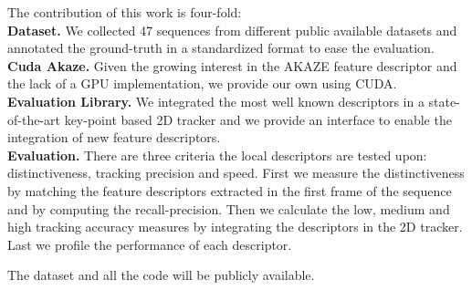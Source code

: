 \documentclass[letterpaper, 10pt, conference]{ieeeconf}
\begin{document}
The contribution of this work is four-fold:\\
\textbf{Dataset.} We collected 47 sequences from different public available datasets and annotated the ground-truth in a standardized format to ease the evaluation.\\
\textbf{Cuda Akaze.} Given the growing interest in the AKAZE feature descriptor and the lack of a GPU implementation, we provide our own using CUDA.\\
\textbf{Evaluation Library.} We integrated the most well known descriptors in a state-of-the-art key-point based 2D tracker and we provide an interface to enable the integration of new feature descriptors.\\
\textbf{Evaluation.}  There are three criteria the local descriptors are tested upon: distinctiveness, tracking precision and speed. First we measure the distinctiveness by matching the feature descriptors extracted in the first frame of the sequence and by computing the recall-precision. Then we calculate the low, medium and high tracking accuracy measures by integrating the descriptors in the 2D tracker. Last we profile the performance of each descriptor.

The dataset and all the code will be publicly available.





%










%
\end{document}
